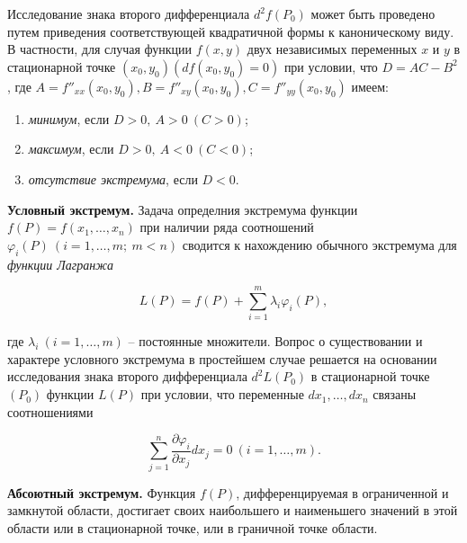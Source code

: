     Исследование знака второго дифференциала $d^{2} f \left( P_{0} \right)$ может быть проведено путем приведения соответствующей квадратичной формы к каноническому виду.\\

    В частности, для случая функции $f \left( x, y \right)$ двух независимых переменных $x$ и $y$ в стационарной точке $\left( x_{0}, y_{0} \right) \left( d f \left( x_{0}, y_{0} \right) =0 \right)$ при условии, что $D = A C - B^{2}$, где $A = f''_{xx} \left( x_{0}, y_{0} \right), B = f''_{xy} \left( x_{0}, y_{0} \right), C = f''_{yy} \left( x_{0}, y_{0} \right)$ имеем:

    \begin{enumerate}
    	\item \textit{минимум}, если $D > 0, \: A > 0 \: \left( C > 0 \right)$;
    	\item \textit{максимум}, если $D > 0, \: A < 0 \: \left( C < 0 \right)$;
    	\item \textit{отсутствие экстремума}, если $D < 0$.
    \end{enumerate}

    \textbf{Условный экстремум.} Задача определния экстремума функции $f \left( P \right) = f \left( x_{1}, \ldots, x_{n} \right)$ при наличии ряда соотношений $\varphi_{i} \left( P \right) \: \left( i = 1, \ldots, m; \: m < n \right)$ сводится к нахождению обычного экстремума для \textit{функции Лагранжа}

    \[
        L \left( P \right) = f \left( P \right) + \sum^{m}_{i = 1} \lambda_{i} \varphi_{i} \left( P \right),
    \]

    где $\lambda_{i} \: \left( i = 1, \ldots, m \right)$ -- постоянные множители. Вопрос о существовании и характере условного экстремума в простейшем случае решается на основании исследования знака второго дифференциала $d^{2} L \left( P_{0} \right)$ в стационарной точке $\left( P_{0} \right)$ функции $L \left( P \right)$ при условии, что переменные $d x_{1}, \ldots, d x_{n}$ связаны соотношениями

    \[
        \sum^{n}_{j = 1} \frac{\partial \varphi_{i}}{\partial x_{j}} d x_{j} = 0 \: \left( i = 1, \ldots, m \right).
    \]

    \textbf{Абсоютный экстремум.} Функция $f \left( P \right)$, дифференцируемая в ограниченной и замкнутой области, достигает своих наибольшего и наименьшего значений в этой области или в стационарной точке, или в граничной точке области.


